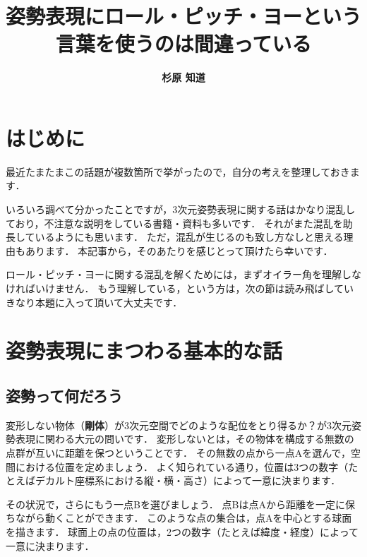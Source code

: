﻿\documentclass[a4paper]{jsarticle}
\title{\bf 姿勢表現にロール・ピッチ・ヨーという言葉を使うのは間違っている}
\author{\Large{\bf 杉原 知道}}
\date{}
\begin{document}
\maketitle
\vspace{-\baselineskip}

\section{はじめに}

最近たまたまこの話題が複数箇所で挙がったので，自分の考えを整理しておきます．

いろいろ調べて分かったことですが，3次元姿勢表現に関する話はかなり混乱しており，不注意な説明をしている書籍・資料も多いです．
それがまた混乱を助長しているようにも思います．
ただ，混乱が生じるのも致し方なしと思える理由もあります．
本記事から，そのあたりを感じとって頂けたら幸いです．

ロール・ピッチ・ヨーに関する混乱を解くためには，まずオイラー角を理解しなければいけません．
もう理解している，という方は，次の節は読み飛ばしていきなり本題に入って頂いて大丈夫です．


\section{姿勢表現にまつわる基本的な話}

\subsection{姿勢って何だろう}

\begin{figure*}[h]
\begin{center}

\end{center}
\end{figure*}

変形しない物体（{\bf 剛体}）が3次元空間でどのような配位をとり得るか？が3次元姿勢表現に関わる大元の問いです．
変形しないとは，その物体を構成する無数の点群が互いに距離を保つということです．
その無数の点から一点Aを選んで，空間における位置を定めましょう．
よく知られている通り，位置は3つの数字（たとえばデカルト座標系における縦・横・高さ）によって一意に決まります．

その状況で，さらにもう一点Bを選びましょう．
点Bは点Aから距離を一定に保ちながら動くことができます．
このような点の集合は，点Aを中心とする球面を描きます．
球面上の点の位置は，2つの数字（たとえば緯度・経度）によって一意に決まります．
\end{document}
